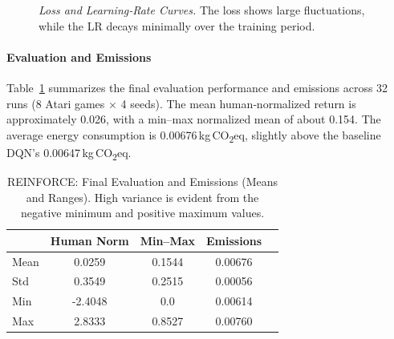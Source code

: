 \begin{figure}
	\centering
	\quad
	\caption{\textit{Loss and Learning‐Rate Curves.} 
		The loss shows large fluctuations, while the LR decays minimally over the training period.}
	\label{fig:reinforce_trainmetrics2}
\end{figure}

\paragraph{Evaluation and Emissions}
Table~\ref{tab:reinforce_evalstats} summarizes the final evaluation performance and emissions across 32 runs (8 Atari games $\times$ 4 seeds). The mean human‐normalized return is approximately \num{0.026}, with a min–max normalized mean of about 0.154. The average energy consumption is \num{0.00676}\,kg\,CO\textsubscript{2}eq, slightly above the baseline DQN's \num{0.00647}\,kg\,CO\textsubscript{2}eq.

\begin{table}
	\caption{REINFORCE: Final Evaluation and Emissions (Means and Ranges). 
		High variance is evident from the negative minimum and positive maximum values.}
	\label{tab:reinforce_evalstats}
	\centering
	\begin{tabular}{lcccc}
		\toprule
		& \textbf{Human Norm} & \textbf{Min--Max} & \textbf{Emissions} \\
		\midrule
		Mean & 0.0259 & 0.1544 & 0.00676 \\
		Std  & 0.3549 & 0.2515 & 0.00056 \\
		Min  & -2.4048 & 0.0    & 0.00614 \\
		Max  & 2.8333 & 0.8527 & 0.00760 \\
		\bottomrule
	\end{tabular}
\end{table}

